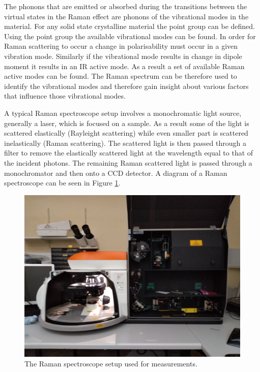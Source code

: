 The phonons that are emitted or absorbed during the transitions between the virtual states in the Raman effect are phonons of the vibrational modes in the material. For any solid state crystalline material the point group can be defined. Using the point group the available vibrational modes can be found. In order for Raman scattering to occur a change in polarisability must occur in a given vibration mode. Similarly if the vibrational mode results in change in dipole moment it results in an IR active mode. As a result a set of available Raman active modes can be found. The Raman spectrum can be therefore used to identify the vibrational modes and therefore gain insight about various factors that influence those vibrational modes.

A typical Raman spectroscope setup involves a monochromatic light source, generally a laser, which is focused on a sample. As a result some of the light is scattered elastically (Rayleight scattering) while even smaller part is scattered inelastically (Raman scattering). The scattered light is then passed through a filter to remove the elastically scattered light at the wavelength equal to that of the incident photons. The remaining Raman scattered light is passed through a monochromator and then onto a CCD detector. A diagram of a Raman spectroscope can be seen in Figure \ref{fig:MethodologyRamanSetup}.

\begin{figure}[!ht]
	\begin{center}
		\includegraphics[scale=0.3]{Methodology/RamanSetup2.png}
		\caption{The Raman spectroscope setup used for measurements.}
		\label{fig:MethodologyRamanSetup}
	\end{center}
\end{figure}

